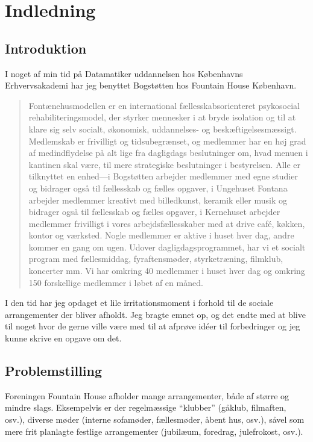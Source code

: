 \documentclass[../main]{subfiles}
\begin{document}
\chapter{Indledning}

\section{Introduktion}
    I noget af min tid på Datamatiker uddannelsen hos Københavns Erhvervsakademi har jeg benyttet Bogstøtten hos Fountain House København.

    \blockcquote[\textemdash][]{fountainhouse}{
        Fontænehusmodellen er en international fællesskabsorienteret psykosocial rehabiliteringsmodel, der styrker mennesker i at bryde isolation og til at klare sig selv socialt, økonomisk, uddannelses- og beskæftigelsesmæssigt.
        \enskip
        Medlemskab er frivilligt og tidsubegrænset, og medlemmer har en høj grad af medindflydelse på alt lige fra dagligdags beslutninger om, hvad menuen i kantinen skal være, til mere strategiske beslutninger i bestyrelsen.
        \enskip
        Alle er tilknyttet en enhed—i Bogstøtten arbejder medlemmer med egne studier og bidrager også til fællesskab og fælles opgaver, i Ungehuset Fontana arbejder medlemmer kreativt med billedkunst, keramik eller musik og bidrager også til fællesskab og fælles opgaver, i Kernehuset arbejder medlemmer frivilligt i vores arbejdsfællesskaber med at drive café, køkken, kontor og værksted.
        \enskip
        Nogle medlemmer er aktive i huset hver dag, andre kommer en gang om ugen.
        \enskip
        Udover dagligdagsprogrammet, har vi et socialt program med fællesmiddag, fyraftensmøder, styrketræning, filmklub, koncerter mm.
        \enskip
        Vi har omkring 40 medlemmer i huset hver dag og omkring 150 forskellige medlemmer i løbet af en måned.
    }

    I den tid har jeg opdaget et lile irritationsmoment i forhold til de sociale arrangementer der bliver afholdt.
    \enskip
    Jeg bragte emnet op, og det endte med at blive til noget hvor de gerne ville være med til at afprøve idéer til forbedringer og jeg kunne skrive en opgave om det.


\section{Problemstilling}
    Foreningen Fountain House afholder mange arrangementer, både af større og mindre slags.
    \enskip
    Eksempelvis er der regelmæssige \enquote{klubber} (gåklub, filmaften, osv.), diverse møder (interne sofamøder, fællesmøder, åbent hus, osv.), såvel som mere frit planlagte festlige arrangementer (jubilæum, foredrag, julefrokost, osv.).
\end{document}
